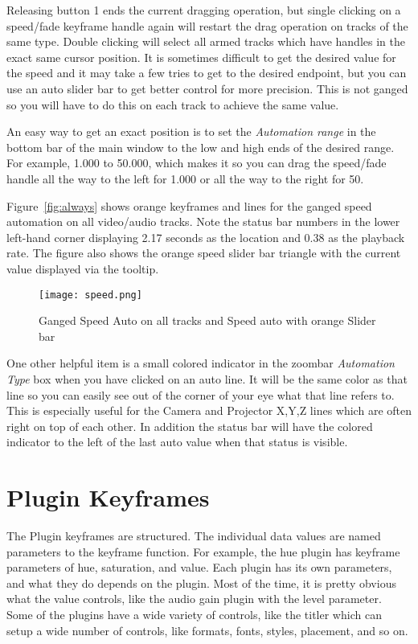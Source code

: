 Releasing button 1 ends the current dragging operation, but single clicking on a speed/fade keyframe handle again will restart the drag operation on tracks of the same type.  Double clicking will select all armed tracks which have handles in the exact same cursor position.  It is sometimes difficult to get the desired value for the speed and it may take a few tries to get to the desired endpoint, but you can use an auto slider bar to get better control for more precision.  This is not ganged so you will have to do this on each track to achieve the same value.

An easy way to get an exact position is to set the \textit{Automation range} in the bottom bar of the main
window to the low and high ends of the desired range. For example, 1.000 to 50.000, which makes it
so you can drag the speed/fade handle all the way to the left for 1.000 or all the way to the right for 50.

Figure~\ref{fig:always} shows orange keyframes and lines for the ganged speed automation on all video/audio tracks.
Note the status bar numbers in the lower left-hand corner displaying 2.17 seconds as the location and 0.38 as the playback rate. The figure also shows the orange speed slider bar triangle with the current value displayed via the tooltip.

\begin{figure}[htpb]
    \centering
    \texttt{[image: speed.png]}
    \caption{Ganged Speed Auto on all tracks and Speed auto with orange Slider bar}
    \label{fig:speed}
\end{figure}

One other helpful item is a small colored indicator in the zoombar \textit{Automation Type} box when you have clicked on an auto line.  It will be the same color as that line so you can easily see out of the corner of your eye what that line refers to.  This is especially useful for the Camera and Projector X,Y,Z lines which are often right on top of each other.  In addition the status bar will have the colored indicator to the left of the last auto value when that status is visible.

\section{Plugin Keyframes}%
\label{sec:plugin_keyframe}

The Plugin keyframes are structured.  The individual data values are named parameters to the keyframe function.  For example, the hue plugin has keyframe parameters of hue, saturation, and value.  Each plugin has its own parameters, and what they do depends on the plugin.  Most of the time, it is pretty obvious what the value controls, like the audio gain plugin with the level parameter.  Some of the plugins have a wide variety of controls, like the titler which can setup a wide number of controls, like formats, fonts, styles, placement, and so on.

